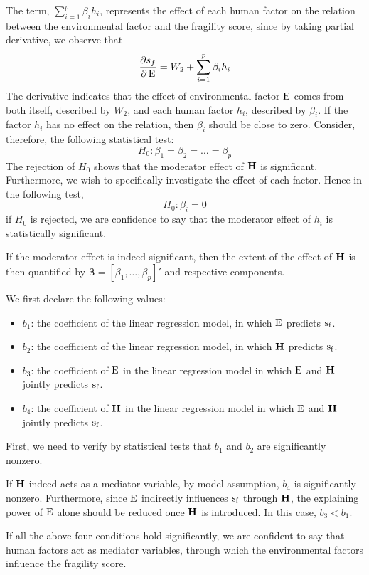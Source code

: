 The term, $\sum_{i=1}^p\beta_i h_i$, represents the effect of each human factor on the relation between the environmental factor and the fragility score, since by taking partial derivative, we observe that 
\begin{equation*}
    \frac{\partial s_f}{\partial \operatorname*{E}} = W_2 + \sum_{i=1}^p \beta_i h_i
\end{equation*}
The derivative indicates that the effect of environmental factor $\operatorname*{E}$ comes from both itself, described by $W_2$, and each human factor $h_i$, described by $\beta_i$. If the factor $h_i$ has no effect on the relation, then $\beta_i$ should be close to zero. Consider, therefore, the following statistical test:
\begin{equation}
    H_0: \beta_1=\beta_2=\ldots=\beta_p
    \label{eqn:model:moderator:testall}
\end{equation}
The rejection of $H_0$ shows that the moderator effect of $\operatorname*{\mathbf{H}}$ is significant. 
Furthermore, we wish to specifically investigate the effect of each factor. Hence in the following test,
\begin{equation}
   H_0:\beta_i=0 
   \label{eqn:model:moderator:testi}
\end{equation}
if $H_0$ is rejected, we are confidence to say that the moderator effect of $h_i$ is statistically significant.

If the moderator effect is indeed significant, then the extent of the effect of $\operatorname*{\mathbf{H}}$ is then quantified by $\mathbf{\beta} = \left[\beta_1,\ldots,\beta_p\right]'$ and respective components.


We first declare the following values:
\begin{itemize}
   \item $b_1$: the coefficient of the linear regression model, in which $\operatorname*{E}$ predicts $\operatorname*{s_f}$.
   \item $b_2$: the coefficient of the linear regression model, in which $\operatorname*{\mathbf{H}}$ predicts $\operatorname*{s_f}$.
   \item $b_3$: the coefficient of $\operatorname*{E}$ in the linear regression model in which $\operatorname*{E}$ and $\operatorname*{\mathbf{H}}$ jointly predicts $\operatorname*{s_f}$.
   \item $b_4$: the coefficient of $\operatorname*{\mathbf{H}}$ in the linear regression model in which $\operatorname*{E}$ and $\operatorname*{\mathbf{H}}$ jointly predicts $\operatorname*{s_f}$.
\end{itemize}

First, we need to verify by statistical tests that $b_1$ and $b_2$ are significantly nonzero.

If $\operatorname*{\mathbf{H}}$ indeed acts as a mediator variable, by model assumption, $b_4$ is significantly nonzero. Furthermore, since $\operatorname*{E}$ indirectly influences $\operatorname*{s_f}$ through $\operatorname*{\mathbf{H}}$, the explaining power of $\operatorname*{E}$ alone should be reduced once $\operatorname*{\mathbf{H}}$ is introduced. In this case, $b_3 < b_1$.

If all the above four conditions hold significantly, we are confident to say that human factors act as mediator variables, through which the environmental factors influence the fragility score.